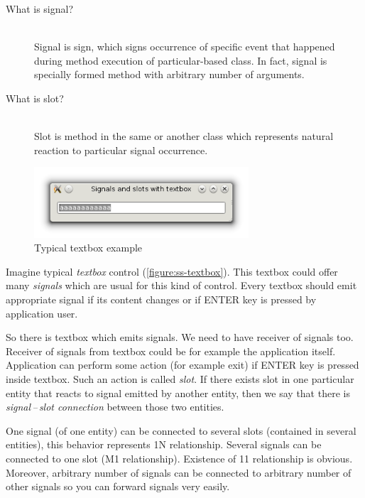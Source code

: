 \begin{description}\label{desc:sig}
\item[What is signal?] \hfill \\
Signal is sign, which signs occurrence of specific event that happened during method execution of particular-based class. In fact, signal is specially formed method with arbitrary number of arguments.
\item[What is slot?] \hfill \\
Slot is method in the same or another class which represents natural reaction to particular signal occurrence.
\end{description}

\begin{figure}[ht]
\centering
\includegraphics[width=8cm]{graphics/laboratory/14-ss-textbox.png}
\caption{Typical textbox example}\label{figure:ss-textbox}
\end{figure}

Imagine typical \textit{textbox} control (\autoref{figure:ss-textbox}). This textbox could offer many \textit{signals} which are usual for this kind of control. Every textbox should emit appropriate signal if its content changes or if ENTER key is pressed by application user.

So there is textbox which emits signals. We need to have receiver of signals too. Receiver of signals from textbox could be for example the application itself. Application can perform some action (for example exit) if ENTER key is pressed inside textbox. Such an action is called \textit{slot}. If there exists slot in one particular entity that reacts to signal emitted by another entity, then we say that there is \textit{signal\,--\,slot connection} between those two entities.

One signal (of one entity) can be connected to several slots (contained in several entities), this behavior represents 1\text{:}N relationship. Several signals can be connected to one slot (M\text{:}1 relationship). Existence of 1\text{:}1 relationship is obvious. Moreover, arbitrary number of signals can be connected to arbitrary number of other signals so you can forward signals very easily.

